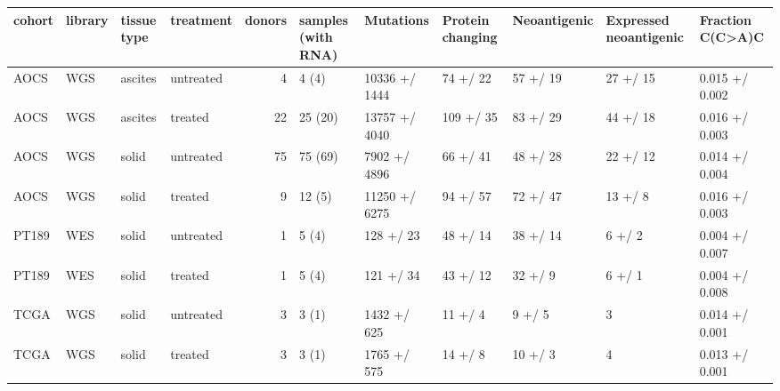 \begin{tabular}{llllrllllll}
\toprule
cohort & library & tissue type &  treatment &  donors & samples (with RNA) &      Mutations & Protein changing & Neoantigenic & Expressed neoantigenic & Fraction C(C>A)C \\
\midrule
  AOCS &     WGS &     ascites &  untreated &       4 &              4 (4) &  10336 +/ 1444 &         74 +/ 22 &     57 +/ 19 &               27 +/ 15 &   0.015 +/ 0.002 \\
  AOCS &     WGS &     ascites &    treated &      22 &            25 (20) &  13757 +/ 4040 &        109 +/ 35 &     83 +/ 29 &               44 +/ 18 &   0.016 +/ 0.003 \\
  AOCS &     WGS &       solid &  untreated &      75 &            75 (69) &   7902 +/ 4896 &         66 +/ 41 &     48 +/ 28 &               22 +/ 12 &   0.014 +/ 0.004 \\
  AOCS &     WGS &       solid &    treated &       9 &             12 (5) &  11250 +/ 6275 &         94 +/ 57 &     72 +/ 47 &                13 +/ 8 &   0.016 +/ 0.003 \\
 PT189 &     WES &       solid &  untreated &       1 &              5 (4) &      128 +/ 23 &         48 +/ 14 &     38 +/ 14 &                 6 +/ 2 &   0.004 +/ 0.007 \\
 PT189 &     WES &       solid &    treated &       1 &              5 (4) &      121 +/ 34 &         43 +/ 12 &      32 +/ 9 &                 6 +/ 1 &   0.004 +/ 0.008 \\
  TCGA &     WGS &       solid &  untreated &       3 &              3 (1) &    1432 +/ 625 &          11 +/ 4 &       9 +/ 5 &                      3 &   0.014 +/ 0.001 \\
  TCGA &     WGS &       solid &    treated &       3 &              3 (1) &    1765 +/ 575 &          14 +/ 8 &      10 +/ 3 &                      4 &   0.013 +/ 0.001 \\
\bottomrule
\end{tabular}
